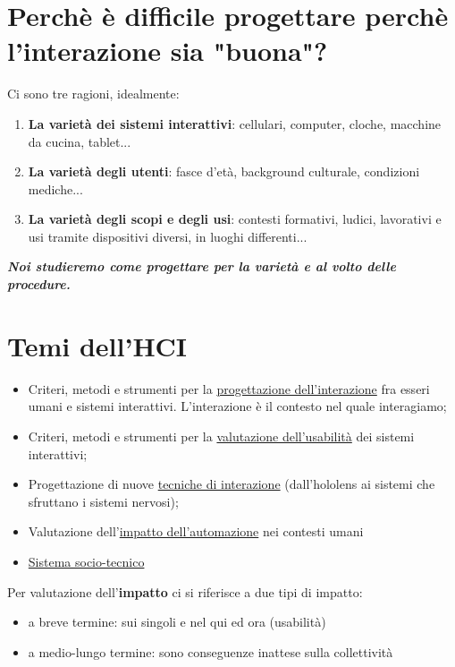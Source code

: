 \documentclass[11pt,a4paper]{book}
\begin{document}
\section{Perchè è difficile progettare perchè l'interazione sia "buona"?}
Ci sono tre ragioni, idealmente:
\begin{enumerate}
	\item \textbf{La varietà dei sistemi interattivi}: cellulari, computer, cloche, macchine da cucina, tablet...
	\item \textbf{La varietà degli utenti}: fasce d'età, background culturale, condizioni mediche...
	\item \textbf{La varietà degli scopi e degli usi}: contesti formativi, ludici, lavorativi e usi tramite dispositivi diversi, in luoghi differenti...
\end{enumerate}

\begin{center}
\textbf{\textit{Noi studieremo come progettare per la varietà e al volto delle procedure.}}
\end{center}

\section{Temi dell'HCI}
\begin{itemize}
	\item Criteri, metodi e strumenti per la \underline{progettazione dell'interazione} fra esseri umani e sistemi interattivi. L'interazione è il contesto nel quale interagiamo;
	\item Criteri, metodi e strumenti per la \underline{valutazione dell'usabilità} dei sistemi interattivi;
	\item Progettazione di nuove \underline{tecniche di interazione} (dall'hololens ai sistemi che sfruttano i sistemi nervosi);
	\item Valutazione dell'\underline{impatto dell'automazione} nei contesti umani
	\item \underline{Sistema socio-tecnico}
\end{itemize}
Per valutazione dell'\textbf{impatto} ci si riferisce a due tipi di impatto:
\begin{itemize}
	\item a breve termine: sui singoli e nel qui ed ora (usabilità)
	\item a medio-lungo termine: sono conseguenze inattese sulla collettività
\end{itemize}
\end{document}
